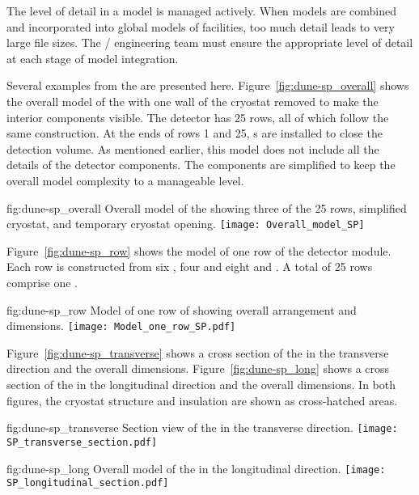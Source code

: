 The level of detail in a model is managed actively. When models are
combined and incorporated into global models of facilities, too much
detail leads to very large file sizes.  The /
engineering team must ensure the appropriate level of detail at each
stage of model integration.


Several examples from the  are presented
here. Figure~\ref{fig:dune-sp_overall} shows the overall model of the
 with one wall of the cryostat removed to make the
interior components visible. The detector has 25 rows, all of which
follow the same construction. At the ends of rows 1 and 25,
\endwall{}s are installed to close the detection volume.  As mentioned
earlier, this model does not include all the details of the detector
components. The components are simplified to keep the overall model
complexity to a manageable level.
\begin{dunefigure}{fig:dune-sp_overall}
  {Overall model of the  showing three of the 25 rows,
    simplified cryostat,  and temporary cryostat opening.}
  \texttt{[image: Overall\_model\_SP]}
\end{dunefigure} 


Figure~\ref{fig:dune-sp_row} shows the model of one row of the
detector module. Each row is constructed from six , four
 and eight  and . A total of 25 rows
comprise one .
\begin{dunefigure}{fig:dune-sp_row}
  {Model of one row of  showing overall arrangement and dimensions.}
  \texttt{[image: Model\_one\_row\_SP.pdf]}
\end{dunefigure}


Figure~\ref{fig:dune-sp_transverse} shows a cross section of the
 in the transverse direction and the overall dimensions.
Figure~\ref{fig:dune-sp_long} shows a cross section of the
 in the longitudinal direction and the overall
dimensions. In both figures, the cryostat structure and insulation are
shown as cross-hatched areas.
\begin{dunefigure}{fig:dune-sp_transverse}
  {Section view of the  in the transverse
    direction.}
  \texttt{[image: SP\_transverse\_section.pdf]}
\end{dunefigure}
\begin{dunefigure}{fig:dune-sp_long}
  {Overall model of the  in the longitudinal direction.}
  \texttt{[image: SP\_longitudinal\_section.pdf]}
\end{dunefigure}



